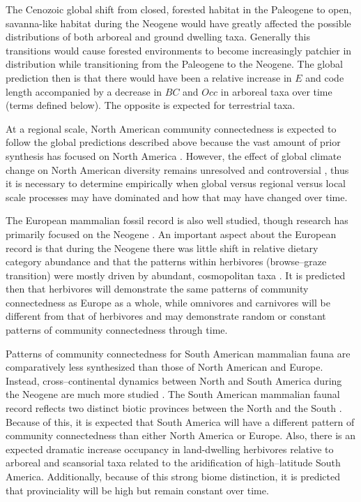 \documentclass[12pt,letterpaper]{article}
\begin{document}
The Cenozoic global shift from closed, forested habitat in the Paleogene to open, savanna-like habitat during the Neogene would have greatly affected the possible distributions of both arboreal and ground dwelling taxa. Generally this transitions would cause forested environments to become increasingly patchier in distribution while transitioning from the Paleogene to the Neogene. The global prediction then is that there would have been a relative increase in \(E\) and code length accompanied by a decrease in \(BC\) and \(Occ\) in arboreal taxa over time (terms defined below). The opposite is expected for terrestrial taxa. 

At a regional scale, North American community connectedness is expected to follow the global predictions described above because the vast amount of prior synthesis has focused on North America \citep{Alroy2000g,Alroy1996a,Alroy1998,Barnosky2001a,Simpson1944,Simpson1953,Badgley2013,Blois2009,Figueirido2012,Gunnell1995,Hadly2001}. However, the effect of global climate change on North American diversity remains unresolved and controversial \citep{Alroy2000g,Blois2009,Figueirido2012,Barnosky2001a}, thus it is necessary to determine empirically when global versus regional versus local scale processes may have dominated and how that may have changed over time.

The European mammalian fossil record is also well studied, though research has primarily focused on the Neogene \citep{Jernvall2002,Jernvall2004,Liow2008,Raia2006,Raia2005,Raia2011c}. An important aspect about the European record is that during the Neogene there was little shift in relative dietary category abundance \citep{Jernvall2004} and that the patterns within herbivores (browse--graze transition) were mostly driven by abundant, cosmopolitan taxa \citep{Jernvall2002}. It is predicted then that herbivores will demonstrate the same patterns of community connectedness as Europe as a whole, while omnivores and carnivores will be different from that of herbivores and may demonstrate random or constant patterns of community connectedness through time. 

Patterns of community connectedness for South American mammalian fauna are comparatively less synthesized than those of North American and Europe. Instead, cross--continental dynamics between North and South America during the Neogene are much more studied \citep{Marshall1982}. The South American mammalian faunal record reflects two distinct biotic provinces between the North and the South \citep{Macfadden1997,Macfadden2006,Flynn1998a,Patterson1968}. Because of this, it is expected that South America will have a different pattern of community connectedness than either North America or Europe. Also, there is an expected dramatic increase occupancy in land-dwelling herbivores relative to arboreal and scansorial taxa related to the aridification of high--latitude South America. Additionally, because of this strong biome distinction, it is predicted that provinciality will be high but remain constant over time. %
\end{document}
